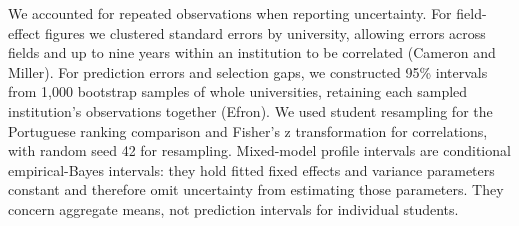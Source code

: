 We accounted for repeated observations when reporting uncertainty. For field-effect figures we clustered standard errors by university, allowing errors across fields and up to nine years within an institution to be correlated (Cameron and Miller). For prediction errors and selection gaps, we constructed 95\% intervals from 1,000 bootstrap samples of whole universities, retaining each sampled institution's observations together (Efron). We used student resampling for the Portuguese ranking comparison and Fisher's z transformation for correlations, with random seed 42 for resampling. Mixed-model profile intervals are conditional empirical-Bayes intervals: they hold fitted fixed effects and variance parameters constant and therefore omit uncertainty from estimating those parameters. They concern aggregate means, not prediction intervals for individual students.
